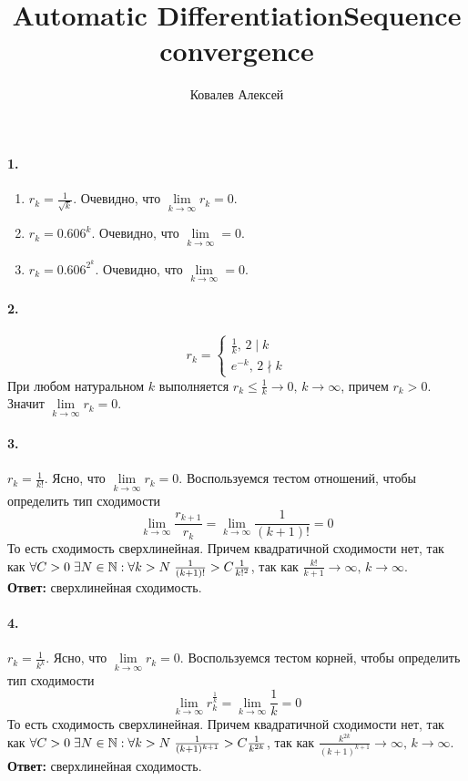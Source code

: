 \documentclass{article}
\title{Automatic Differentiation}
\title{Sequence convergence}
\author{Ковалев Алексей}
\date{}
\newcommand*{\1}{\mathbf{1}}
\begin{document}
\maketitle
\paragraph{1.}
\begin{enumerate}
    \item $ r_k = \frac{1}{\sqrt{k}} $. Очевидно, что $\lim\limits_{k \to \infty} r_k = 0$.
    \item $ r_k = 0.606^k $. Очевидно, что $\lim\limits_{k \to \infty} = 0$.
    \item $ r_k = 0.606^{2^k} $. Очевидно, что $\lim\limits_{k \to \infty} = 0$.
\end{enumerate}


\paragraph{2.}
\[ r_k = \begin{cases}
    \frac{1}{k},\, 2 \mid k \\
    e^{-k},\, 2 \nmid k
\end{cases} \]
При любом натуральном $k$ выполняется $ r_k \leqslant \frac{1}{k} \to 0,\, k \to \infty $, причем $r_k > 0$. Значит $\lim\limits_{k \to \infty} r_k = 0$.

\paragraph{3.} $r_k = \frac{1}{k!}$. Ясно, что $\lim\limits_{k \to \infty} r_k = 0$. Воспользуемся тестом отношений, чтобы определить тип сходимости
\[ \lim\limits_{k \to \infty} \frac{r_{k + 1}}{r_k} = \lim\limits_{k \to \infty} \frac{1}{(k + 1)!} = 0 \]
То есть сходимость сверхлинейная. Причем квадратичной сходимости нет, так как $\forall C > 0 \; \exists N \in \mathbb{N} :\: \\ \forall k > N \; \frac{1}{(k + 1)!} > C \frac{1}{k!^2}$, так как $\frac{k!}{k + 1} \to \infty,\, k \to \infty$. \\ 
\textbf{Ответ: } сверхлинейная сходимость.


\paragraph{4.}$r_k = \frac{1}{k^k}$. Ясно, что $\lim\limits_{k \to \infty} r_k = 0$. Воспользуемся тестом корней, чтобы определить тип сходимости
\[ \lim\limits_{k \to \infty} r_k^\frac{1}{k} = \lim\limits_{k \to \infty} \frac{1}{k} = 0 \]
То есть сходимость сверхлинейная. Причем квадратичной сходимости нет, так как $\forall C > 0 \; \exists N \in \mathbb{N} :\: \\ \forall k > N \; \frac{1}{(k + 1)^{k + 1}} > C \frac{1}{k^{2k}}$, так как $\frac{k^{2k}}{(k + 1)^{k + 1}} \to \infty,\, k \to \infty$. \\ 
\textbf{Ответ: } сверхлинейная сходимость.
\end{document}
